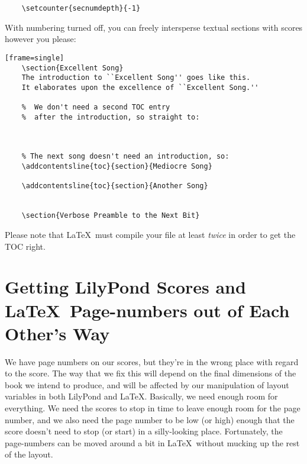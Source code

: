 \documentclass[../../LilyPond-Tutorials]{subfiles}
\begin{document}
\begin{verbatim}
	\setcounter{secnumdepth}{-1}
\end{verbatim}

With  numbering turned off, you can freely intersperse textual sections with scores however you please:

\begin{verbatim}[frame=single] 
	\section{Excellent Song} 
	The introduction to ``Excellent Song'' goes like this. 
	It elaborates upon the excellence of ``Excellent Song.'' 
	
	%  We don't need a second TOC entry  
	%  after the introduction, so straight to: 
	
	
	
	% The next song doesn't need an introduction, so: 
	\addcontentsline{toc}{section}{Mediocre Song} 
	 
	\addcontentsline{toc}{section}{Another Song} 
	
	
	\section{Verbose Preamble to the Next Bit}
\end{verbatim}

Please note that \LaTeX\ must compile your file at least \textit{twice} in order to get the TOC right. 

\section*{Getting LilyPond Scores and \LaTeX\ Page-numbers out of Each Other's Way}

We have page numbers on our scores, but they're in the wrong place with regard to the score. 
The way that we fix this will depend on the final dimensions of the book we intend to produce, and will be affected by our manipulation of layout variables in both LilyPond and \LaTeX. 
Basically, we need enough room for everything. 
We need the scores to stop in time to leave enough room for the page number, and we also need the page number to be low (or high) enough that the score doesn’t need to stop (or start) in a silly-looking place. 
Fortunately, the page-numbers can be moved around a bit in \LaTeX\ without mucking up the rest of the layout.
\end{document}
